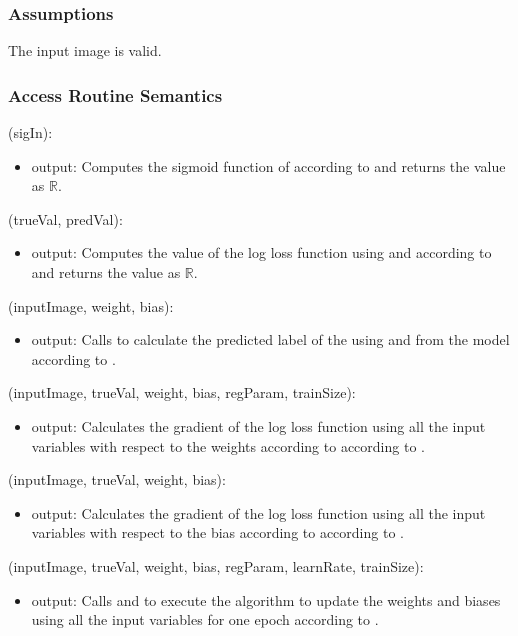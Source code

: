 \documentclass[12pt, titlepage]{article}
\begin{document}
\subsubsection{Assumptions}

The input image is valid.

\subsubsection{Access Routine Semantics}

\noindent {}(sigIn):
\begin{itemize}
\item output: Computes the sigmoid function of  according to 
and returns the value  as $\mathbb{R}$.
\end{itemize}

\noindent {}(trueVal, predVal):
\begin{itemize}
\item output: Computes the value of the log loss function using  and 
according to  and returns the value  as $\mathbb{R}$.
\end{itemize}

\noindent {}(inputImage, weight, bias):
\begin{itemize}
\item output: Calls  to calculate the predicted label of the 
using  and  from the model according to .
\end{itemize}

\noindent {}(inputImage, trueVal, weight, bias, regParam, trainSize):
\begin{itemize}
\item output: Calculates the gradient of the log loss function using all the input variables
with respect to the weights according to according to .
\end{itemize}

\noindent {}(inputImage, trueVal, weight, bias):
\begin{itemize}
  \item output: Calculates the gradient of the log loss function using all the input variables
  with respect to the bias according to according to .
\end{itemize}

\noindent {}(inputImage, trueVal, weight, bias, regParam, learnRate, trainSize):
\begin{itemize}
\item output: Calls  and  to
execute the algorithm to update the weights and biases using all the input variables 
for one epoch according to .
\end{itemize}
\end{document}
